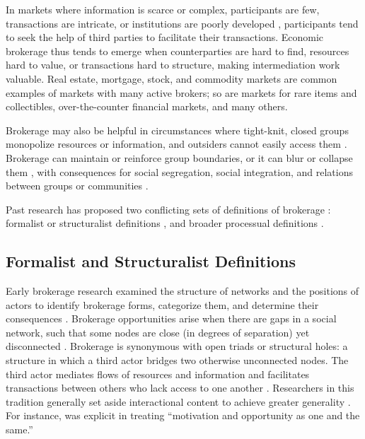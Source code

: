 \documentclass[
]{article}
\begin{document}
In markets where information is scarce or complex, participants are few, transactions are intricate, or institutions are poorly developed \autocite{stovelStabilizingBrokerage2011}, participants tend to seek the help of third parties to facilitate their transactions. Economic brokerage thus tends to emerge when counterparties are hard to find, resources hard to value, or transactions hard to structure, making intermediation work valuable. Real estate, mortgage, stock, and commodity markets are common examples of markets with many active brokers; so are markets for rare items and collectibles, over-the-counter financial markets, and many others.

Brokerage may also be helpful in circumstances where tight-knit, closed groups monopolize resources or information, and outsiders cannot easily access them \autocite[140]{stovelBrokerage2012}. Brokerage can maintain or reinforce group boundaries, or it can blur or collapse them \autocite{stovelBrokerage2012}, with consequences for social segregation, social integration, and relations between groups or communities \autocite{galsterWordsDeedsRacial2005}.

Past research has proposed two conflicting sets of definitions of brokerage \autocite[for a review, see][]{eriksonFormalistRelationalistTheory2013}: formalist or structuralist definitions \autocite{burtStructuralHolesSocial1992,gouldStructuresMediationFormal1989,granovetterStrengthWeakTies1973,marsdenBrokerageBehaviorRestricted1982}, and broader processual definitions \autocite{obstfeldBrokerageProcessDecoupling2014,rossmanObfuscatoryRelationalWork2014,spiroExtendedStructuresMediation2013,stovelBrokerage2012}.

\subsection{Formalist and Structuralist Definitions}

Early brokerage research examined the structure of networks and the positions of actors to identify brokerage forms, categorize them, and determine their consequences \autocite{burtStructuralHolesSocial1992,burtStructuralHolesGood2004,gouldStructuresMediationFormal1989,granovetterStrengthWeakTies1973,marsdenBrokerageBehaviorRestricted1982,simmelConflictWebGroupAffiliations1964,simmelIndividualitySocialForms1971}. Brokerage opportunities arise when there are gaps in a social network, such that some nodes are close (in degrees of separation) yet disconnected \autocite{burtStructuralHolesSocial1992,burtStructuralHolesGood2004,marsdenBrokerageBehaviorRestricted1982}. Brokerage is synonymous with open triads or structural holes: a structure in which a third actor bridges two otherwise unconnected nodes. The third actor mediates flows of resources and information and facilitates transactions between others who lack access to one another \autocites[1457]{fernandezDilemmaStatePower1994}[202]{marsdenBrokerageBehaviorRestricted1982}. Researchers in this tradition generally set aside interactional content to achieve greater generality \autocite{eriksonFormalistRelationalistTheory2013}. For instance, \textcite[36]{burtStructuralHolesSocial1992} was explicit in treating ``motivation and opportunity as one and the same.''
\end{document}

